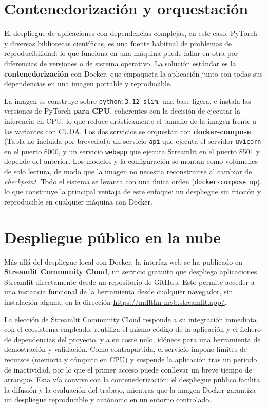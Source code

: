 \section{Contenedorización y orquestación}
\label{sec::dep_docker}

El despliegue de aplicaciones con dependencias complejas, en este caso, PyTorch y
diversas bibliotecas científicas, es una fuente habitual de problemas de
reproducibilidad: lo que funciona en una máquina puede fallar en otra por
diferencias de versiones o de sistema operativo. La solución estándar es la
\textbf{contenedorización} con Docker, que empaqueta la aplicación junto con todas
sus dependencias en una imagen portable y reproducible.

La imagen se construye sobre \texttt{python:3.12-slim}, una base ligera, e instala
las versiones de PyTorch \textbf{para CPU}, coherentes con la decisión de ejecutar
la inferencia en CPU, lo que reduce drásticamente el tamaño de la imagen frente a
las variantes con CUDA. Los dos servicios se orquestan con \textbf{docker-compose}
(Tabla no incluida por brevedad): un servicio \texttt{api} que ejecuta el servidor
\texttt{uvicorn} en el puerto 8000, y un servicio \texttt{webapp} que ejecuta
Streamlit en el puerto 8501 y depende del anterior. Los modelos y la configuración
se montan como volúmenes de solo lectura, de modo que la imagen no necesita
reconstruirse al cambiar de \textit{checkpoint}. Todo el sistema se levanta con una
única orden (\texttt{docker-compose up}), lo que constituye la principal ventaja de
este enfoque: un despliegue sin fricción y reproducible en cualquier máquina con
Docker.


\section{Despliegue público en la nube}
\label{sec::dep_nube}

Más allá del despliegue local con Docker, la interfaz web se ha publicado en
\textbf{Streamlit Community Cloud}, un servicio gratuito que despliega aplicaciones
Streamlit directamente desde un repositorio de GitHub. Esto permite acceder a una
instancia funcional de la herramienta desde cualquier navegador, sin instalación
alguna, en la dirección
\url{https://mdltfm-mvb.streamlit.app/}.

La elección de Streamlit Community Cloud responde a su integración inmediata con el
ecosistema empleado, reutiliza el mismo código de la aplicación y el fichero de
dependencias del proyecto, y a su coste nulo, idóneos para una herramienta de
demostración y validación. Como contrapartida, el servicio impone límites de recursos
(memoria y cómputo en CPU) y suspende la aplicación tras un periodo de inactividad,
por lo que el primer acceso puede conllevar un breve tiempo de arranque. Esta vía
convive con la contenedorización: el despliegue público facilita la difusión y la
evaluación del trabajo, mientras que la imagen Docker garantiza un despliegue
reproducible y autónomo en un entorno controlado.


